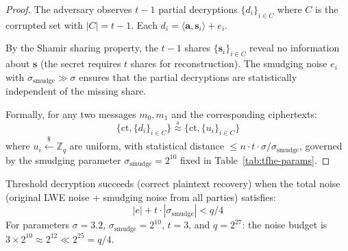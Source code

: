 \begin{proof}
The adversary observes $t-1$ partial decryptions $\{d_i\}_{i \in C}$ where $C$ is the
corrupted set with $|C| = t - 1$. Each $d_i = \langle \mathbf{a}, \mathbf{s}_i \rangle + e_i$.

By the Shamir sharing property, the $t-1$ shares $\{\mathbf{s}_i\}_{i \in C}$ reveal no
information about $\mathbf{s}$ (the secret requires $t$ shares for reconstruction).
The smudging noise $e_i$ with $\sigma_{\text{smudge}} \gg \sigma$ ensures that the
partial decryptions are statistically independent of the missing share.

Formally, for any two messages $m_0, m_1$ and the corresponding ciphertexts:
\[
\{\text{ct}, \{d_i\}_{i \in C}\} \overset{s}{\approx} \{\text{ct}, \{u_i\}_{i \in C}\}
\]
where $u_i \stackrel{\$}{\leftarrow} \mathbb{Z}_q$ are uniform, with statistical
distance $\leq n \cdot t \cdot \sigma / \sigma_{\text{smudge}}$, governed by the
smudging parameter $\sigma_{\text{smudge}} = 2^{10}$ fixed in
Table~\ref{tab:tfhe-params}.
\end{proof}

\begin{lemma}
\label{lem:threshold-correctness}
Threshold decryption succeeds (correct plaintext recovery) when the total noise
(original LWE noise + smudging noise from all parties) satisfies:
\[
|e| + t \cdot |\sigma_{\text{smudge}}| < q/4
\]
For parameters $\sigma = 3.2$, $\sigma_{\text{smudge}} = 2^{10}$, $t = 3$, and
$q = 2^{27}$: the noise budget is $3 \times 2^{10} \approx 2^{12} \ll 2^{25} = q/4$.
\end{lemma}

